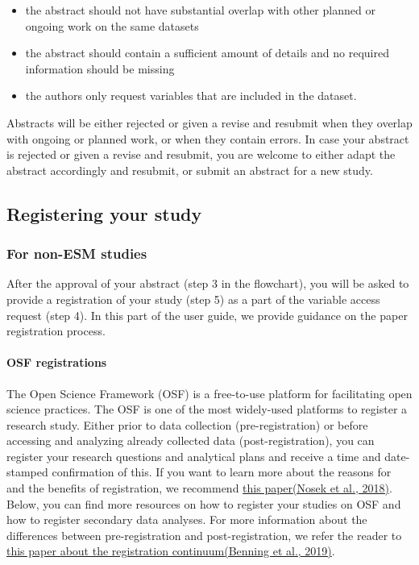 \documentclass[
]{article}
\providecommand{\tightlist}{%
  \setlength{\itemsep}{0pt}\setlength{\parskip}{0pt}}
\begin{document}
\begin{itemize}
\tightlist
\item
  the abstract should not have substantial overlap with other planned or
  ongoing work on the same datasets
\item
  the abstract should contain a sufficient amount of details and no
  required information should be missing
\item
  the authors only request variables that are included in the dataset.
\end{itemize}

Abstracts will be either rejected or given a revise and resubmit when
they overlap with ongoing or planned work, or when they contain errors.
In case your abstract is rejected or given a revise and resubmit, you
are welcome to either adapt the abstract accordingly and resubmit, or
submit an abstract for a new study.

\hypertarget{registering-your-study}{%
\subsection{Registering your study}\label{registering-your-study}}

\hypertarget{for-non-esm-studies}{%
\subsubsection{For non-ESM studies}\label{for-non-esm-studies}}

After the approval of your abstract (step 3 in the flowchart), you will
be asked to provide a registration of your study (step 5) as a part of
the variable access request (step 4). In this part of the user guide, we
provide guidance on the paper registration process.

\hypertarget{osf-registrations}{%
\paragraph{OSF registrations}\label{osf-registrations}}

The Open Science Framework (OSF) is a free-to-use platform for
facilitating open science practices. The OSF is one of the most
widely-used platforms to register a research study. Either prior to data
collection (pre-registration) or before accessing and analyzing already
collected data (post-registration), you can register your research
questions and analytical plans and receive a time and date-stamped
confirmation of this. If you want to learn more about the reasons for
and the benefits of registration, we recommend
\href{https://www.pnas.org/doi/epdf/10.1073/pnas.1708274114}{this
paper}\href{https://www.zotero.org/google-docs/?E8wJIv}{(Nosek et al.,
2018)}. Below, you can find more resources on how to register your
studies on OSF and how to register secondary data analyses. For more
information about the differences between pre-registration and
post-registration, we refer the reader to
\href{https://psycnet.apa.org/doiLanding?doi=10.1037\%2Fabn0000451}{this
paper about the registration
continuum}\href{https://www.zotero.org/google-docs/?z1Lw8r}{(Benning et
al., 2019)}.
\end{document}
